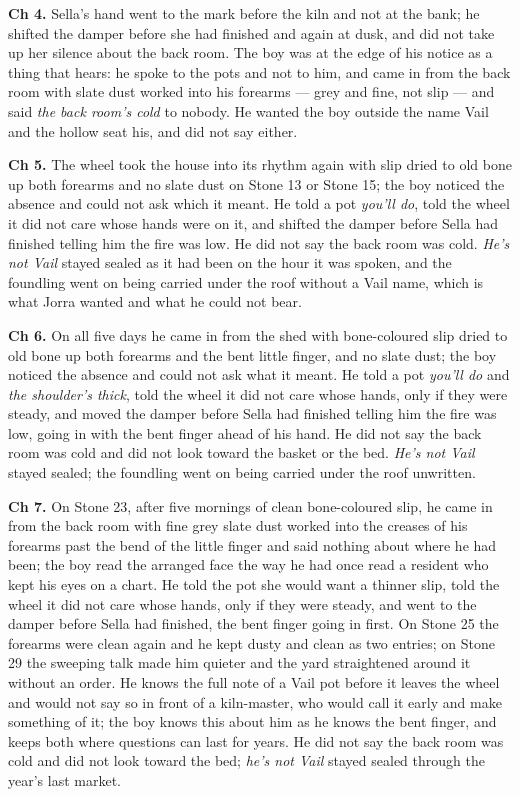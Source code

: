\documentclass{design/chronicle}
\begin{document}
{\textbf{Ch 4.} Sella’s hand went to the mark before the kiln and not at the bank; he shifted the damper before she had finished and again at dusk, and did not take up her silence about the back room. The boy was at the edge of his notice as a thing that hears: he spoke to the pots and not to him, and came in from the back room with slate dust worked into his forearms --- grey and fine, not slip --- and said \emph{the back room’s cold} to nobody. He wanted the boy outside the name Vail and the hollow seat his, and did not say either.

\textbf{Ch 5.} The wheel took the house into its rhythm again with slip dried to old bone up both forearms and no slate dust on Stone 13 or Stone 15; the boy noticed the absence and could not ask which it meant. He told a pot \emph{you’ll do}, told the wheel it did not care whose hands were on it, and shifted the damper before Sella had finished telling him the fire was low. He did not say the back room was cold. \emph{He’s not Vail} stayed sealed as it had been on the hour it was spoken, and the foundling went on being carried under the roof without a Vail name, which is what Jorra wanted and what he could not bear.

\textbf{Ch 6.} On all five days he came in from the shed with bone-coloured slip dried to old bone up both forearms and the bent little finger, and no slate dust; the boy noticed the absence and could not ask what it meant. He told a pot \emph{you’ll do} and \emph{the shoulder’s thick}, told the wheel it did not care whose hands, only if they were steady, and moved the damper before Sella had finished telling him the fire was low, going in with the bent finger ahead of his hand. He did not say the back room was cold and did not look toward the basket or the bed. \emph{He’s not Vail} stayed sealed; the foundling went on being carried under the roof unwritten.

\textbf{Ch 7.} On Stone 23, after five mornings of clean bone-coloured slip, he came in from the back room with fine grey slate dust worked into the creases of his forearms past the bend of the little finger and said nothing about where he had been; the boy read the arranged face the way he had once read a resident who kept his eyes on a chart. He told the pot she would want a thinner slip, told the wheel it did not care whose hands, only if they were steady, and went to the damper before Sella had finished, the bent finger going in first. On Stone 25 the forearms were clean again and he kept dusty and clean as two entries; on Stone 29 the sweeping talk made him quieter and the yard straightened around it without an order. He knows the full note of a Vail pot before it leaves the wheel and would not say so in front of a kiln-master, who would call it early and make something of it; the boy knows this about him as he knows the bent finger, and keeps both where questions can last for years. He did not say the back room was cold and did not look toward the bed; \emph{he’s not Vail} stayed sealed through the year’s last market.

}
\end{document}
